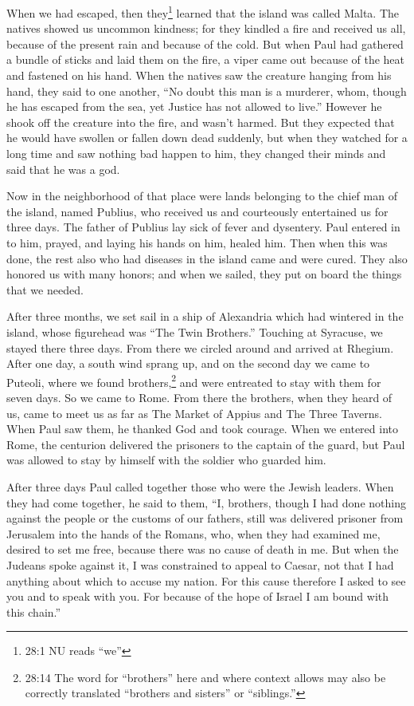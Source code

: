 \mychapter{} \myverse*{}When we had escaped, then they\footnote{28:1 NU reads “we”} learned that the island was called Malta.
\myverse{}The natives showed us uncommon kindness; for they kindled a fire and received
us all, because of the present rain and because of the cold.
\myverse{}But when Paul had gathered a bundle of sticks and laid them on the fire, a
viper came out because of the heat and fastened on his hand.
\myverse{}When the natives saw the creature hanging from his hand, they said to one another,
“No doubt this man is a murderer, whom, though he has escaped from the sea, yet Justice has not allowed
to live.”
\myverse{}However he shook off the creature into the fire, and wasn’t harmed.
\myverse{}But they expected that he would have swollen or fallen down dead suddenly,
but when they watched for a long time and saw nothing bad happen to him, they changed their minds and
said that he was a god.

\myverse{}Now in the neighborhood of that place were lands belonging to
the chief man of the island, named Publius, who received us and courteously entertained us for three days.
\myverse{}The father of Publius lay sick of fever and dysentery. Paul entered in to him,
prayed, and laying his hands on him, healed him.
\myverse{}Then when this was done, the rest also who had diseases in the island came
and were cured.
\myverse{}They also honored us with many honors; and when we sailed, they put on board
the things that we needed.

\myverse{}After three months, we set sail in a ship of Alexandria which
had wintered in the island, whose figurehead was “The Twin Brothers.”
\myverse{}Touching at Syracuse, we stayed there three days.
\myverse{}From there we circled around and arrived at Rhegium. After one day, a south
wind sprang up, and on the second day we came to Puteoli,
\myverse{}where we found brothers,\footnote{28:14 The word for “brothers” here and where context allows may also be correctly translated “brothers
	and sisters” or “siblings.”} and were entreated to stay with them for seven days. So we came to
Rome.
\myverse{}From there the brothers, when they heard of us, came to meet us as far as
The Market of Appius and The Three Taverns. When Paul saw them, he thanked God and took courage.
\myverse{}When we entered into Rome, the centurion delivered the prisoners to the captain
of the guard, but Paul was allowed to stay by himself with the soldier who guarded him.

\myverse{}After three days Paul called together those who were the Jewish leaders.
When they had come together, he said to them, “I, brothers, though I had done nothing against the people
or the customs of our fathers, still was delivered prisoner from Jerusalem into the hands of the Romans,
\myverse{}who, when they had examined me, desired to set me free, because there was
no cause of death in me.
\myverse{}But when the Judeans spoke against it, I was constrained to appeal to Caesar,
not that I had anything about which to accuse my nation.
\myverse{}For this cause therefore I asked to see you and to speak with you. For because
of the hope of Israel I am bound with this chain.”


